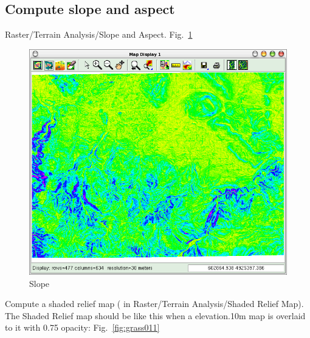 \subsection{Compute slope and aspect}
Raster/Terrain Analysis/Slope and Aspect. Fig.~\ref{fig:grass010}

\begin{figure}[htbp]
   \centering
   \includegraphics[scale=0.35]{grass010.png}
   \caption{Slope}
   \label{fig:grass010}
\end{figure}

Compute a shaded relief map ( in Raster/Terrain Analysis/Shaded Relief Map).
The Shaded Relief map should be like this when a elevation.10m map is overlaid to it with 0.75 opacity: Fig.~\ref{fig:grass011}

